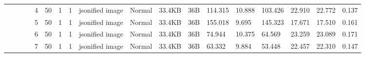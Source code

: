 \begin{landscape}
\begin{table}[]
{\begin{tabular}{@{}ccccllllllllllllll@{}}
                                                                                   &                              &                                &                                                                                                          & 4                                                     & 50                                       & 1                                          & 1                                 & jsonified image                  & Normal                             & 33.4KB                                        & 36B                                             & 114.315                 & 10.888   & 103.426                      & 22.910                  & 22.772   & 0.137                        \\
                                                                                   &                              &                                &                                                                                                          & 5                                                     & 50                                       & 1                                          & 1                                 & jsonified image                  & Normal                             & 33.4KB                                        & 36B                                             & 155.018                 & 9.695    & 145.323                      & 17.671                  & 17.510   & 0.161                        \\
                                                                                   &                              &                                &                                                                                                          & 6                                                     & 50                                       & 1                                          & 1                                 & jsonified image                  & Normal                             & 33.4KB                                        & 36B                                             & 74.944                  & 10.375   & 64.569                       & 23.259                  & 23.089   & 0.171                        \\
                                                                                   &                              &                                &                                                                                                          & 7                                                     & 50                                       & 1                                          & 1                                 & jsonified image                  & Normal                             & 33.4KB                                        & 36B                                             & 63.332                  & 9.884    & 53.448                       & 22.457                  & 22.310   & 0.147                        \\

\end{tabular}}
\end{table}
\end{landscape}
